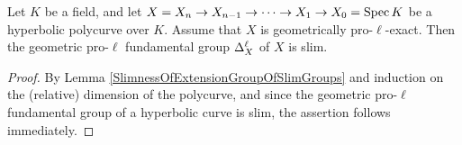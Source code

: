 \begin{lem}\label{SlimnessOfGeometricProEllFundamentalGroupOfGeometricallyProEllExactHyperbolicPolycurves}
  Let $K$ be a field, and let $X = X_n \to X_{n - 1} \to \cdots \to X_1 \to X_0 = \mathrm{Spec} \, K$ be a hyperbolic polycurve over $K$. Assume that $X$ is geometrically pro-$\ell$-exact. Then the geometric pro-$\ell$ fundamental group $\Delta_{X}^\ell$ of $X$ is slim.
\end{lem}
\begin{proof}
  By Lemma \ref{SlimnessOfExtensionGroupOfSlimGroups} and induction on the (relative) dimension of the polycurve, and since the geometric pro-$\ell$ fundamental group of a hyperbolic curve is slim, the assertion follows immediately.
\end{proof}


